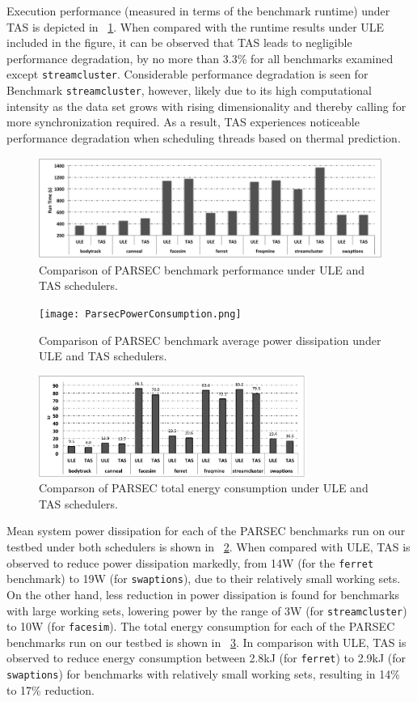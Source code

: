 \documentclass[times, 10pt,twocolumn]{IEEEtran}
\begin{document}
Execution performance (measured in terms of the benchmark runtime) under TAS 
is depicted in \figurename~\ref{fig:pbenchmarkp}.
When compared with the runtime results under ULE included in the figure,
it can be observed that TAS leads to negligible performance degradation,
by no more than 3.3\% for all benchmarks examined except \texttt{streamcluster}.
Considerable performance degradation is seen for Benchmark \texttt{streamcluster},
however, likely due to its high computational intensity as the data set
grows with rising dimensionality and thereby calling for
more synchronization required.
As a result, TAS experiences noticeable performance degradation
when scheduling threads based on thermal prediction.

\begin{figure}[tbp]
  \includegraphics[width=1.0\linewidth,height=1.3in]{graphics/parsecperformance}
  \caption{Comparison of PARSEC benchmark performance under ULE and TAS
schedulers.}
  \label{fig:pbenchmarkp}
\end{figure} 
\begin{figure}[tbp]
  \texttt{[image: ParsecPowerConsumption.png]}
  \caption{Comparison of PARSEC benchmark average power dissipation under ULE and TAS schedulers.}
  \label{fig:pbenchmark}
\end{figure}
\begin{figure}[tbp]
  \centering
  \includegraphics[width=1.0\linewidth,height=1.3in]{parseckj}
  \caption{Comparson of PARSEC total energy consumption under ULE and TAS schedulers.}
  \label{fig:penergy}
\end{figure}
Mean system power dissipation for each of the PARSEC benchmarks run on our testbed
under both schedulers is shown in \figurename~\ref{fig:pbenchmark}.
When compared with ULE, TAS is observed to reduce 
power dissipation markedly, from 14W (for the \texttt{ferret} benchmark) 
to 19W (for \texttt{swaptions}), due to their relatively small working sets.
On the other hand, less reduction in power dissipation is found for
benchmarks with large working sets, lowering power by the range of
3W (for \texttt{streamcluster}) to 10W (for \texttt{facesim}).   The
total energy consumption for each of the PARSEC benchmarks run on our
testbed is shown in \figurename~\ref{fig:penergy}.   In comparison with
ULE, TAS is observed to reduce energy consumption between 2.8kJ (for
\texttt{ferret}) to 2.9kJ (for \texttt{swaptions}) for benchmarks with
relatively small working sets, resulting in 14\% to 17\% reduction.
\end{document}
